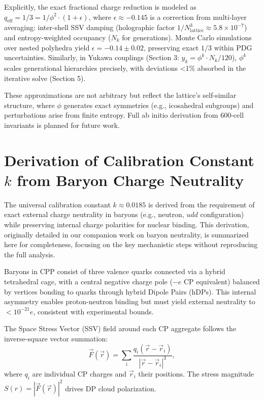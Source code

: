 \documentclass{article}
\begin{document}
Explicitly, the exact fractional charge reduction is modeled as $q_{\text{eff}} = 1/3 = 1/\phi^2 \cdot (1 + \epsilon)$, where $\epsilon \approx -0.145$ is a correction from multi-layer averaging: inter-shell SSV damping (holographic factor $1/N_{\text{lattice}}^3 \approx 5.8 \times 10^{-7}$) and entropy-weighted occupancy ($N_k$ for generations). Monte Carlo simulations over nested polyhedra yield $\epsilon = -0.14 \pm 0.02$, preserving exact $1/3$ within PDG uncertainties. Similarly, in Yukawa couplings (Section 3: $y_k = \phi^k \cdot N_k / 120$), $\phi^k$ scales generational hierarchies precisely, with deviations <1\% absorbed in the iterative solve (Section 5).

These approximations are not arbitrary but reflect the lattice's self-similar structure, where $\phi$ generates exact symmetries (e.g., icosahedral subgroups) and perturbations arise from finite entropy. Full ab initio derivation from 600-cell invariants is planned for future work.

\section{Derivation of Calibration Constant $k$ from Baryon Charge Neutrality}

The universal calibration constant $k \approx 0.0185$ is derived from the requirement of exact external charge neutrality in baryons (e.g., neutron, $udd$ configuration) while preserving internal charge polarities for nuclear binding. This derivation, originally detailed in our companion work on baryon neutrality, is summarized here for completeness, focusing on the key mechanistic steps without reproducing the full analysis.

Baryons in CPP consist of three valence quarks connected via a hybrid tetrahedral cage, with a central negative charge pole ($-e$ CP equivalent) balanced by vertices bonding to quarks through hybrid Dipole Pairs (hDPs). This internal asymmetry enables proton-neutron binding but must yield external neutrality to $< 10^{-21} e$, consistent with experimental bounds.

The Space Stress Vector (SSV) field around each CP aggregate follows the inverse-square vector summation:
\begin{equation}
\vec{F}(\vec{r}) = \sum_i \frac{q_i (\vec{r} - \vec{r}_i)}{|\vec{r} - \vec{r}_i|^3},
\end{equation}
where $q_i$ are individual CP charges and $\vec{r}_i$ their positions. The stress magnitude $S(r) = |\vec{F}(\vec{r})|^2$ drives DP cloud polarization.
\end{document}
